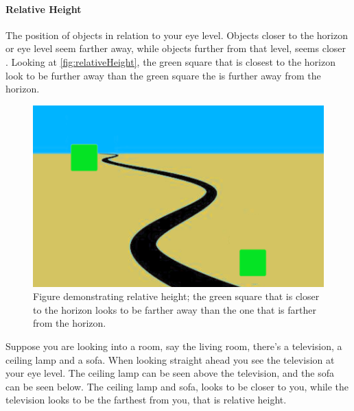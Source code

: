 			\paragraph{Relative Height}
				The position of objects in relation to your eye level. Objects closer to the horizon or eye level seem farther away, while objects further from that level, seems closer \citep{relativeHeight}. Looking at \autoref{fig:relativeHeight}, the green square that is closest to the horizon look to be further away than the green square the is further away from the horizon. 
				\begin{figure}[H]
					\centering
					\includegraphics[width=0.6\linewidth]{figure/relativeHeight}
					\caption{Figure demonstrating relative height; the green square that is closer to the horizon looks to be farther away than the one that is farther from the horizon.}
					\label{fig:relativeHeight}
				\end{figure}
				Suppose you are looking into a room, say the living room, there's a television, a ceiling lamp and a sofa. When looking straight ahead you see the television at your eye level. The ceiling lamp can be seen above the television, and the sofa can be seen below. The ceiling lamp and sofa, looks to be closer to you, while the television looks to be the farthest from you, that is relative height.
